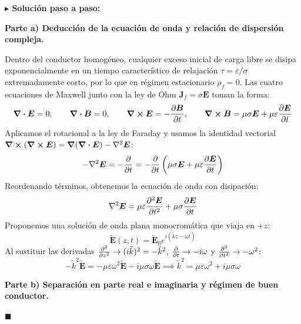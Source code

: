 \documentclass[11pt,a4paper]{book}
\newenvironment{solucion}{%
    \par\medskip\noindent\textbf{\color{blue!65!black}\Large $\blacktriangleright$ Solución paso a paso:}\par\medskip
}{%
    \hfill$\blacksquare$\par\bigskip
}
\newcommand{\Evec}{\bm{E}}
\newcommand{\Bvec}{\bm{B}}
\newcommand{\Jvec}{\bm{J}}
\begin{document}
\begin{solucion}
\textbf{Parte a) Deducción de la ecuación de onda y relación de dispersión compleja.}

Dentro del conductor homogéneo, cualquier exceso inicial de carga libre se disipa exponencialmente en un tiempo característico de relajación $\tau = \varepsilon/\sigma$ extremadamente corto, por lo que en régimen estacionario $\rho_f = 0$. Las cuatro ecuaciones de Maxwell junto con la ley de Ohm $\Jvec_f = \sigma\Evec$ toman la forma:
\begin{equation}
    \div{\Evec} = 0, \qquad \div{\Bvec} = 0, \qquad \curl{\Evec} = -\pdv{\Bvec}{t}, \qquad \curl{\Bvec} = \mu\sigma\Evec + \mu\varepsilon\pdv{\Evec}{t}
\end{equation}
Aplicamos el rotacional a la ley de Faraday y usamos la identidad vectorial $\curl(\curl{\Evec}) = \grad(\div{\Evec}) - \nabla^2\Evec$:
\begin{equation}
    -\nabla^2\Evec = -\pdv{}{t}(\curl{\Bvec}) = -\pdv{}{t}\left( \mu\sigma\Evec + \mu\varepsilon\pdv{\Evec}{t} \right)
\end{equation}
Reordenando términos, obtenemos la ecuación de onda con disipación:
\begin{equation}
    \nabla^2\Evec = \mu\varepsilon\pdv[2]{\Evec}{t} + \mu\sigma\pdv{\Evec}{t}
\end{equation}
Proponemos una solución de onda plana monocromática que viaja en $+z$:
\begin{equation}
    \tilde{\Evec}(z,t) = \tilde{\Evec}_0 e^{i(\tilde{k}z - \omega t)}
\end{equation}
Al sustituir las derivadas $\pdv[2]{}{z} \to (i\tilde{k})^2 = -\tilde{k}^2$, $\pdv{}{t} \to -i\omega$ y $\pdv[2]{}{t} \to -\omega^2$:
\begin{equation}
    -\tilde{k}^2 \tilde{\Evec} = -\mu\varepsilon\omega^2 \tilde{\Evec} - i\mu\sigma\omega \tilde{\Evec} \implies \tilde{k}^2 = \mu\varepsilon\omega^2 + i\mu\sigma\omega
\end{equation}

\medskip
\textbf{Parte b) Separación en parte real e imaginaria y régimen de buen conductor.}


\end{solucion}
\end{document}
